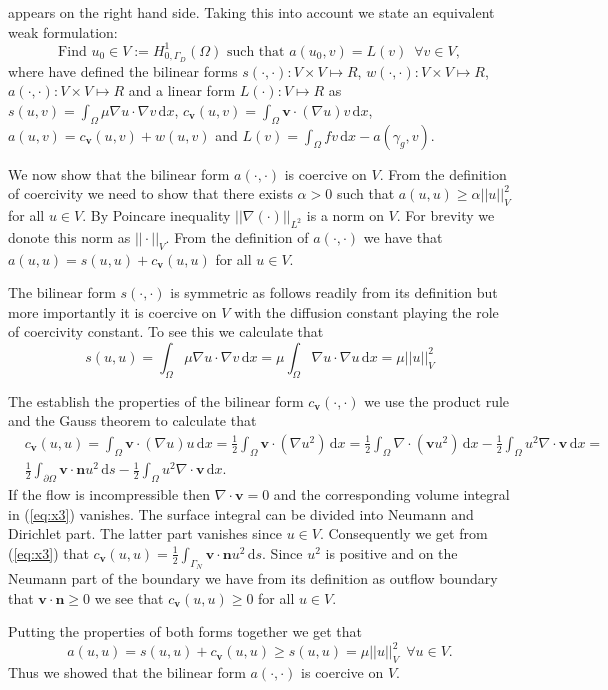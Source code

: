 \documentclass[a4paper,11pt,titlepage]{article}
\newcommand{\VEC}[1]{\ensuremath{\textbf{#1}}}
\begin{document}
appears on the right hand side. Taking this into account we state an equivalent weak formulation:
 \begin{equation*}
\text{Find } u_0\in V:=H^1_{0,\Gamma_D}(\Omega)\text{ such that }
a(u_0,v)=L(v)\,\,\,\forall v\in V,
\end{equation*}
where have defined the bilinear forms $s(\cdot,\cdot):V\times V\mapsto R$, $w(\cdot,\cdot):V\times V\mapsto R$, $a(\cdot,\cdot):V\times V\mapsto R$ and a linear form
$L(\cdot):V \mapsto R$ as $s(u,v)=\int_{\Omega} \mu\nabla u\cdot \nabla v\,\mathrm{d}x$, $c_{\VEC{v}}(u,v)=\int_{\Omega} \VEC{v}\cdot(\nabla u)v\,\mathrm{d}x$, 
$a(u,v)=c_{\VEC{v}}(u,v)+w(u,v)$ and $L(v)=\int_\Omega f v \,\mathrm{d}x - a(\gamma_g,v)$.

We now show that the bilinear form $a(\cdot,\cdot)$ is coercive on $V$. From the definition of coercivity we need to show that there exists $\alpha>0$ such that 
$a(u,u)\geq\alpha||u||^2_V$ for all $u\in V$. By Poincare inequality $||\nabla(\cdot)||_{L^2}$ is a norm on $V$. For brevity we donote this norm as $||\cdot||_{V}$. From the definition of $a(\cdot,\cdot)$ we have that $a(u,u)=s(u,u)+c_{\VEC{v}}(u,u)$ 
for all $u\in V$.

The bilinear form $s(\cdot,\cdot)$ is symmetric as follows readily from its definition but more importantly it is coercive on $V$ with the diffusion constant playing the role
of coercivity constant. To see this we calculate that
\begin{equation}
\label{eq:x2}
 s(u,u)=\int_{\Omega} \mu\nabla u\cdot \nabla v\,\mathrm{d}x =\mu \int_{\Omega} \nabla u\cdot \nabla u\,\mathrm{d}x=\mu ||u||^2_V
\end{equation}


The establish the properties of the bilinear form $c_{\VEC{v}}(\cdot,\cdot)$ we use the product rule and the Gauss theorem to calculate that
\begin{equation}
\label{eq:x3}
\begin{aligned}
 &c_{\VEC{v}}(u,u) = \int_\Omega \VEC{v}\cdot(\nabla u) u\,\mathrm{d}x=\frac{1}{2} \int_\Omega \VEC{v}\cdot(\nabla u^2) \,\mathrm{d}x = 
 \frac{1}{2} \int_{\Omega}\nabla\cdot(\VEC{v} u^2)\,\mathrm{d}x -  \frac{1}{2}\int_\Omega u^2 \nabla\cdot\VEC{v}\,\mathrm{d}x =\\
 & \frac{1}{2} \int_{\partial\Omega}\VEC{v}\cdot\VEC{n} u^2\,\mathrm{d}s -  \frac{1}{2}\int_\Omega u^2 \nabla\cdot\VEC{v}\,\mathrm{d}x.
\end{aligned}
 \end{equation}
If the flow is incompressible then $\nabla\cdot\VEC{v}=0$ and the corresponding volume integral in (\ref{eq:x3}) vanishes. The surface integral
can be divided into Neumann and Dirichlet part. The latter part vanishes since $u\in V$. Consequently we get from (\ref{eq:x3}) that  
$c_{\VEC{v}}(u,u)=\frac{1}{2} \int_{\Gamma_N}\VEC{v}\cdot\VEC{n} u^2\,\mathrm{d}s$. Since $u^2$ is positive and on the Neumann part
of the boundary we have from its definition as outflow boundary that $\VEC{v}\cdot\VEC{n}\geq0$ we see that $c_{\VEC{v}}(u,u)\geq0$ for all $u\in V$.

Putting the properties of both forms together we get that
\[
 a(u,u) = s(u,u) + c_{\VEC{v}}(u,u) \geq s(u,u) =\mu ||u||^2_V\,\,\,\forall u\in V.
\]
Thus we showed that the bilinear form $a(\cdot,\cdot)$ is coercive on $V$.
\end{document}

